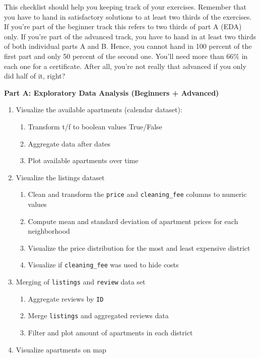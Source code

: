 \documentclass[
  11pt,
]{book}
\begin{document}
This checklist should help you keeping track of your exercises. Remember that you have to hand in satisfactory solutions to at least two thirds of the exercises. If you're part of the beginner track this refers to two thirds of part A (EDA) only. If you're part of the advanced track, you have to hand in at least two thirds of both individual parts A and B. Hence, you cannot hand in 100 percent of the first part and only 50 percent of the second one. You'll need more than 66\% in each one for a certificate. After all, you're not really that advanced if you only did half of it, right?

\textbf{Part A: Exploratory Data Analysis (Beginners + Advanced)}

\begin{enumerate}
\def\labelenumi{\arabic{enumi}.}
\item
  Visualize the available apartments (calendar dataset):

  \begin{enumerate}
  \def\labelenumii{\alph{enumii}.}
  \item
    Transform t/f to boolean values True/False
  \item
    Aggregate data after dates
  \item
    Plot available apartments over time
  \end{enumerate}
\item
  Visualize the listings dataset

  \begin{enumerate}
  \def\labelenumii{\alph{enumii}.}
  \item
    Clean and transform the \texttt{price} and \texttt{cleaning\_fee} columns to numeric values
  \item
    Compute mean and standard deviation of apartment prices for each neighborhood
  \item
    Visualize the price distribution for the most and least expensive district
  \item
    Visualize if \texttt{cleaning\_fee} was used to hide costs
  \end{enumerate}
\item
  Merging of \texttt{listings} and \texttt{review} data set

  \begin{enumerate}
  \def\labelenumii{\alph{enumii}.}
  \item
    Aggregate reviews by \texttt{ID}
  \item
    Merge \texttt{listings} and aggregated reviews data
  \item
    Filter and plot amount of apartments in each district
  \end{enumerate}
\item
  Visualize apartments on map


\end{enumerate}
\end{document}
